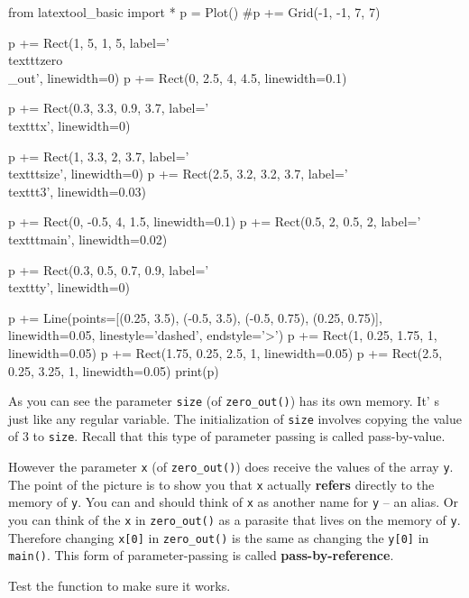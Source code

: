\begin{python}
from latextool_basic import *
p = Plot()
#p += Grid(-1, -1, 7, 7)

p += Rect(1, 5, 1, 5, label='\\texttt{zero\\_out}', linewidth=0)
p += Rect(0, 2.5, 4, 4.5, linewidth=0.1)

p += Rect(0.3, 3.3, 0.9, 3.7, label='\\texttt{x}', linewidth=0)

p += Rect(1, 3.3, 2, 3.7, label='\\texttt{size}', linewidth=0)
p += Rect(2.5, 3.2, 3.2, 3.7, label='\\texttt{3}', linewidth=0.03)

p += Rect(0, -0.5, 4, 1.5, linewidth=0.1)
p += Rect(0.5, 2, 0.5, 2, label='\\texttt{main}', linewidth=0.02)

p += Rect(0.3, 0.5, 0.7, 0.9, label='\\texttt{y}', linewidth=0)

p += Line(points=[(0.25, 3.5), (-0.5, 3.5), (-0.5, 0.75), (0.25, 0.75)], linewidth=0.05, linestyle='dashed', endstyle='>')
p += Rect(1, 0.25, 1.75, 1, linewidth=0.05)
p += Rect(1.75, 0.25, 2.5, 1, linewidth=0.05)
p += Rect(2.5, 0.25, 3.25, 1, linewidth=0.05)
print(p)
\end{python}

As you can see the parameter \texttt{size} (of \texttt{zero\_out()}) has its own memory. It' s just like any regular variable. The initialization of \texttt{size} involves copying the value of 3 to \texttt{size}. Recall that this type of parameter passing is called pass-by-value.

However the parameter \texttt{x} (of \texttt{zero\_out()}) does  receive the values of the array \texttt{y}. The point of the picture is to show you that \texttt{x} actually \textbf{refers} directly to the memory of \texttt{y}. You can and should think of \texttt{x} as another name for \texttt{y} -- an alias. Or you can think of the \texttt{x} in \texttt{zero\_out()} as a parasite that lives on the memory of \texttt{y}. Therefore changing \texttt{x[0]} in \texttt{zero\_out()} is the same as changing the \texttt{y[0]} in \texttt{main()}. This form of parameter-passing is called \textbf{pass-by-reference}.

Test the function to make sure it works.





